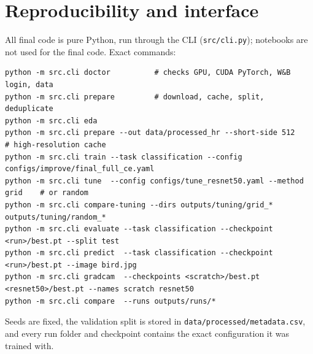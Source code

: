 \documentclass[11pt,a4paper]{article}
\begin{document}
\section{Reproducibility and interface}
All final code is pure Python, run through the CLI (\texttt{src/cli.py}); notebooks are not used for the final code. Exact commands:
{\footnotesize
\begin{verbatim}
python -m src.cli doctor          # checks GPU, CUDA PyTorch, W&B login, data
python -m src.cli prepare         # download, cache, split, deduplicate
python -m src.cli eda
python -m src.cli prepare --out data/processed_hr --short-side 512     # high-resolution cache
python -m src.cli train --task classification --config configs/improve/final_full_ce.yaml
python -m src.cli tune  --config configs/tune_resnet50.yaml --method grid    # or random
python -m src.cli compare-tuning --dirs outputs/tuning/grid_* outputs/tuning/random_*
python -m src.cli evaluate --task classification --checkpoint <run>/best.pt --split test
python -m src.cli predict  --task classification --checkpoint <run>/best.pt --image bird.jpg
python -m src.cli gradcam  --checkpoints <scratch>/best.pt <resnet50>/best.pt --names scratch resnet50
python -m src.cli compare  --runs outputs/runs/*
\end{verbatim}
}
Seeds are fixed, the validation split is stored in \texttt{data/processed/metadata.csv}, and every run folder and checkpoint
contains the exact configuration it was trained with.

\end{document}
